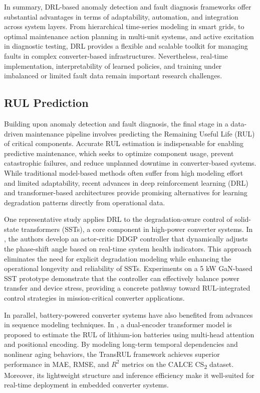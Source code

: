 In summary, DRL-based anomaly detection and fault diagnosis frameworks offer substantial advantages in terms of adaptability, automation, and integration across system layers. From hierarchical time-series modeling in smart grids, to optimal maintenance action planning in multi-unit systems, and active excitation in diagnostic testing, DRL provides a flexible and scalable toolkit for managing faults in complex converter-based infrastructures. Nevertheless, real-time implementation, interpretability of learned policies, and training under imbalanced or limited fault data remain important research challenges.

\subsection{RUL Prediction}
\label{sec:rul_prediction}

Building upon anomaly detection and fault diagnosis, the final stage in a data-driven maintenance pipeline involves predicting the Remaining Useful Life (RUL) of critical components. Accurate RUL estimation is indispensable for enabling predictive maintenance, which seeks to optimize component usage, prevent catastrophic failures, and reduce unplanned downtime in converter-based systems. While traditional model-based methods often suffer from high modeling effort and limited adaptability, recent advances in deep reinforcement learning (DRL) and transformer-based architectures provide promising alternatives for learning degradation patterns directly from operational data.

One representative study applies DRL to the degradation-aware control of solid-state transformers (SSTs), a core component in high-power converter systems. In \cite{haque2021deep}, the authors develop an actor-critic DDGP controller that dynamically adjusts the phase-shift angle based on real-time system health indicators. This approach eliminates the need for explicit degradation modeling while enhancing the operational longevity and reliability of SSTs. Experiments on a 5 kW GaN-based SST prototype demonstrate that the controller can effectively balance power transfer and device stress, providing a concrete pathway toward RUL-integrated control strategies in mission-critical converter applications.

In parallel, battery-powered converter systems have also benefited from advances in sequence modeling techniques. In \cite{saleem2024transrul}, a dual-encoder transformer model is proposed to estimate the RUL of lithium-ion batteries using multi-head attention and positional encoding. By modeling long-term temporal dependencies and nonlinear aging behaviors, the TransRUL framework achieves superior performance in MAE, RMSE, and \(R^2\) metrics on the CALCE CS\textsubscript{2} dataset. Moreover, its lightweight structure and inference efficiency make it well-suited for real-time deployment in embedded converter systems.

